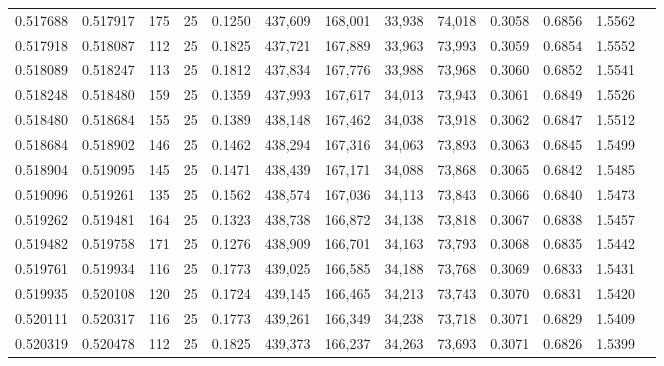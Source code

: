 \begin{tabular}{rrrrrrrrrrrrr}
0.517688 & 0.517917 &   175 &  25 &                                     0.1250 & 437,609 & 168,001 &  33,938 &  74,018 & 0.3058 & 0.6856 & 1.5562 \\
0.517918 & 0.518087 &   112 &  25 &                                     0.1825 & 437,721 & 167,889 &  33,963 &  73,993 & 0.3059 & 0.6854 & 1.5552 \\
0.518089 & 0.518247 &   113 &  25 &                                     0.1812 & 437,834 & 167,776 &  33,988 &  73,968 & 0.3060 & 0.6852 & 1.5541 \\
0.518248 & 0.518480 &   159 &  25 &                                     0.1359 & 437,993 & 167,617 &  34,013 &  73,943 & 0.3061 & 0.6849 & 1.5526 \\
0.518480 & 0.518684 &   155 &  25 &                                     0.1389 & 438,148 & 167,462 &  34,038 &  73,918 & 0.3062 & 0.6847 & 1.5512 \\
0.518684 & 0.518902 &   146 &  25 &                                     0.1462 & 438,294 & 167,316 &  34,063 &  73,893 & 0.3063 & 0.6845 & 1.5499 \\
0.518904 & 0.519095 &   145 &  25 &                                     0.1471 & 438,439 & 167,171 &  34,088 &  73,868 & 0.3065 & 0.6842 & 1.5485 \\
0.519096 & 0.519261 &   135 &  25 &                                     0.1562 & 438,574 & 167,036 &  34,113 &  73,843 & 0.3066 & 0.6840 & 1.5473 \\
0.519262 & 0.519481 &   164 &  25 &                                     0.1323 & 438,738 & 166,872 &  34,138 &  73,818 & 0.3067 & 0.6838 & 1.5457 \\
0.519482 & 0.519758 &   171 &  25 &                                     0.1276 & 438,909 & 166,701 &  34,163 &  73,793 & 0.3068 & 0.6835 & 1.5442 \\
0.519761 & 0.519934 &   116 &  25 &                                     0.1773 & 439,025 & 166,585 &  34,188 &  73,768 & 0.3069 & 0.6833 & 1.5431 \\
0.519935 & 0.520108 &   120 &  25 &                                     0.1724 & 439,145 & 166,465 &  34,213 &  73,743 & 0.3070 & 0.6831 & 1.5420 \\
0.520111 & 0.520317 &   116 &  25 &                                     0.1773 & 439,261 & 166,349 &  34,238 &  73,718 & 0.3071 & 0.6829 & 1.5409 \\
0.520319 & 0.520478 &   112 &  25 &                                     0.1825 & 439,373 & 166,237 &  34,263 &  73,693 & 0.3071 & 0.6826 & 1.5399 \\

\end{tabular}
